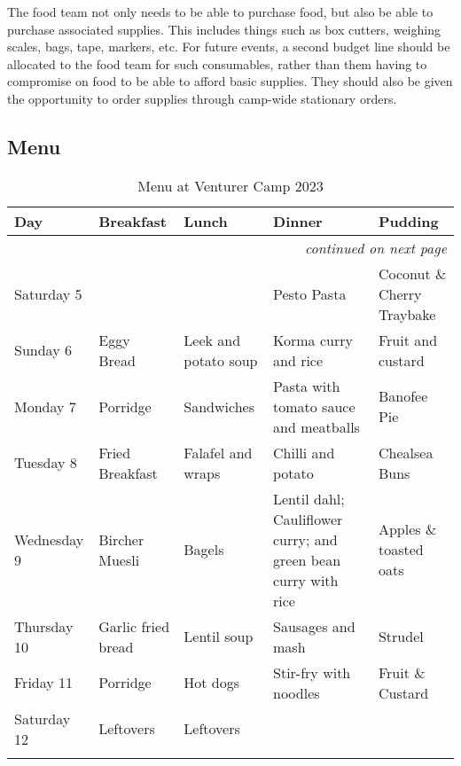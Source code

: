 The food team not only needs to be able to purchase food, but also be able to purchase associated supplies. This includes things such as box cutters, weighing scales, bags, tape, markers, etc. For future events, a second budget line should be allocated to the food team for such consumables, rather than them having to compromise on food to be able to afford basic supplies. They should also be given the opportunity to order supplies through camp-wide stationary orders. 

\subsection{Menu}
{\RaggedRight \centering
\begin{longtable}{p{} p{} p{} p{} p{}}
\textbf{Day} & \textbf{Breakfast} & \textbf{Lunch} & \textbf{Dinner} & \textbf{Pudding} \\ 
\hline
\endhead

\multicolumn{5}{r}{\footnotesize\itshape continued on next page}\\
\endfoot 

\endlastfoot

Saturday 5 & \cellcolor{gray!25} & \cellcolor{gray!25} & Pesto Pasta & Coconut \& Cherry Traybake\\
\hline
Sunday 6 & Eggy Bread & Leek and potato soup & Korma curry and rice & Fruit and custard \\
\hline
Monday 7 & Porridge & Sandwiches& \cellcolor{red!25} Pasta with tomato sauce and meatballs & Banofee Pie\\
\hline
Tuesday 8 & Fried Breakfast & Falafel and wraps & Chilli and potato & Chealsea Buns \\
\hline
Wednesday 9 & Bircher Muesli & \cellcolor{red!25} Bagels & Lentil dahl; Cauliflower curry; and green bean curry with rice & Apples \& toasted oats\\
\hline
Thursday 10 & Garlic fried bread & Lentil soup & \cellcolor{red!25} Sausages and mash  & Strudel\\
\hline
Friday 11 & Porridge & \cellcolor{red!25} Hot dogs & Stir-fry with noodles & Fruit \& Custard\\
\hline
Saturday 12 & Leftovers & Leftovers & \cellcolor{gray!25} & \cellcolor{gray!25}\\
\hline

\caption{Menu at Venturer Camp 2023}
\end{longtable}
}%

